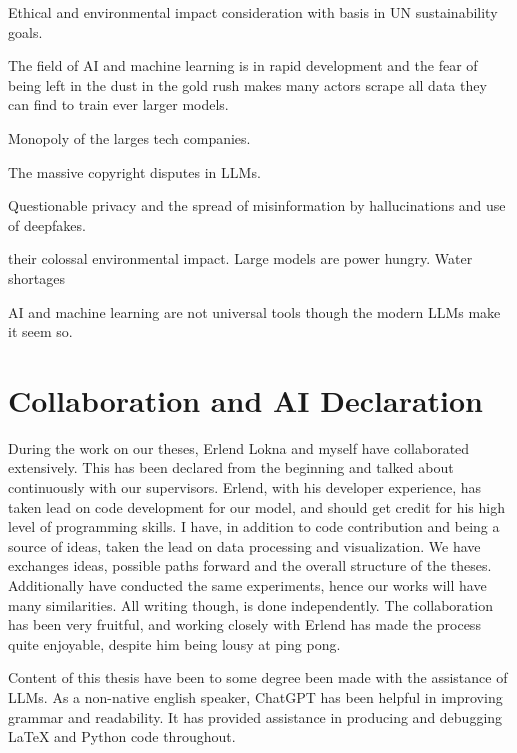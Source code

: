 \documentclass[../../thesis.tex]{subfiles}
\begin{document}
Ethical and environmental impact consideration with basis in UN sustainability goals.

The field of AI and machine learning is in rapid development and the fear of being left in the dust in the gold rush makes many actors scrape all data they can find to train ever larger models. 

Monopoly of the larges tech companies.

The massive copyright disputes in LLMs.

Questionable privacy and the spread of misinformation by hallucinations and use of deepfakes.

their colossal environmental impact. Large models are power hungry. Water shortages 


AI and machine learning are not universal tools though the modern LLMs make it seem so.

\section{Collaboration and AI Declaration}

During the work on our theses, Erlend Lokna and myself have collaborated extensively. This has been declared from the beginning and talked about continuously with our supervisors. Erlend, with his developer experience, has taken lead on code development for our model, and should get credit for his high level of programming skills. I have, in addition to code contribution and being a source of ideas, taken the lead on data processing and visualization. We have exchanges ideas, possible paths forward and the overall structure of the theses. Additionally have conducted the same experiments, hence our works will have many similarities. All writing though, is done independently. The collaboration has been very fruitful, and working closely with Erlend has made the process quite enjoyable, despite him being lousy at ping pong. \newline

Content of this thesis have been to some degree been made with the assistance of LLMs. As a non-native english speaker, ChatGPT has been helpful in improving grammar and readability. It has provided assistance in producing and debugging LaTeX and Python code throughout.
\end{document}

